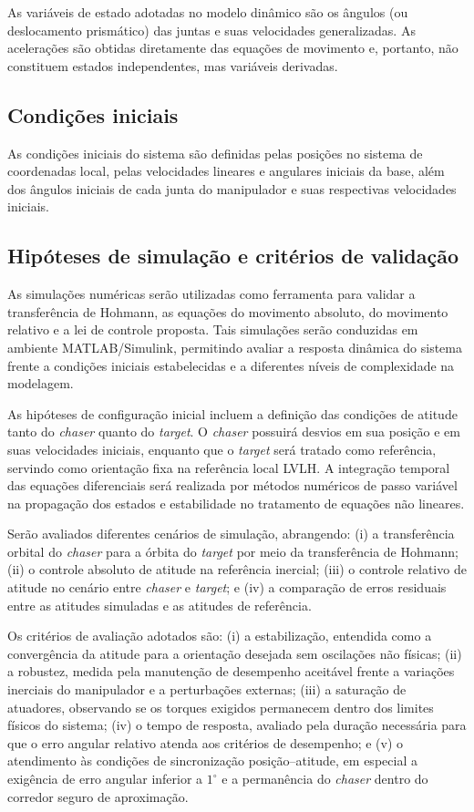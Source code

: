 As variáveis de estado adotadas no modelo dinâmico são os ângulos (ou deslocamento prismático) das juntas e suas velocidades generalizadas.
As acelerações são obtidas diretamente das equações de movimento e, portanto, não constituem estados independentes, mas variáveis derivadas.

\subsection{Condições iniciais}
As condições iniciais do sistema são definidas pelas posições no sistema de coordenadas local, pelas velocidades lineares e angulares iniciais da base, além dos ângulos iniciais de cada junta do manipulador e suas respectivas velocidades iniciais.

\subsection{Hipóteses de simulação e critérios de validação}

As simulações numéricas serão utilizadas como ferramenta para validar a transferência de Hohmann, as equações do movimento absoluto, do movimento relativo e a lei de controle proposta.
Tais simulações serão conduzidas em ambiente MATLAB/Simulink, permitindo avaliar a resposta dinâmica do sistema frente a condições iniciais estabelecidas e a diferentes níveis de complexidade na modelagem.

As hipóteses de configuração inicial incluem a definição das condições de atitude tanto do \emph{chaser} quanto do \emph{target}.
O \emph{chaser} possuirá desvios em sua posição e em suas velocidades iniciais, enquanto que o \emph{target} será tratado como referência, servindo como orientação fixa na referência local LVLH.
A integração temporal das equações diferenciais será realizada por métodos numéricos de passo variável na propagação dos estados e estabilidade no tratamento de equações não lineares.  

Serão avaliados diferentes cenários de simulação, abrangendo:
(i) a transferência orbital do \emph{chaser} para a órbita do \emph{target} por meio da transferência de Hohmann;
(ii) o controle absoluto de atitude na referência inercial;
(iii) o controle relativo de atitude no cenário entre \emph{chaser} e \emph{target}; e
(iv) a comparação de erros residuais entre as atitudes simuladas e as atitudes de referência.

Os critérios de avaliação adotados são:
(i) a estabilização, entendida como a convergência da atitude para a orientação desejada sem oscilações não físicas;
(ii) a robustez, medida pela manutenção de desempenho aceitável frente a variações inerciais do manipulador e a perturbações externas;
(iii) a saturação de atuadores, observando se os torques exigidos permanecem dentro dos limites físicos do sistema;
(iv) o tempo de resposta, avaliado pela duração necessária para que o erro angular relativo atenda aos critérios de desempenho; e
(v) o atendimento às condições de sincronização posição--atitude, em especial a exigência de erro angular inferior a $1^\circ$ e a permanência do \emph{chaser} dentro do corredor seguro de aproximação.
